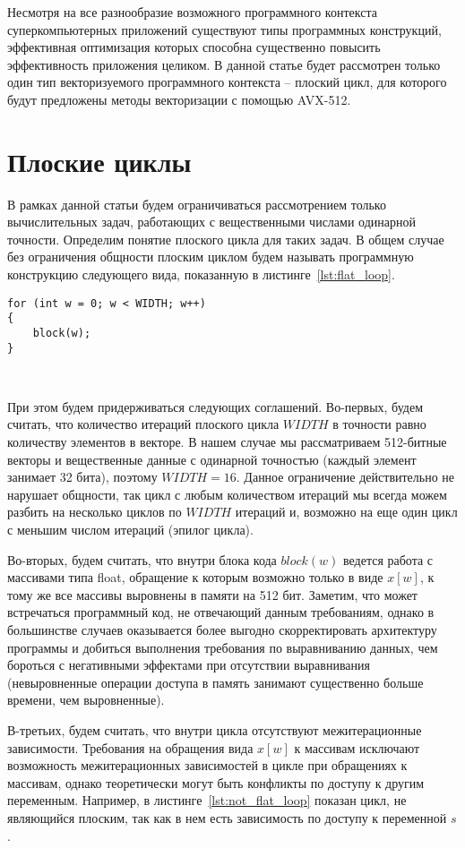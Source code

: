 \documentclass[
11pt,%
tightenlines,%
twoside,%
onecolumn,%
nofloats,%
nobibnotes,%
nofootinbib,%
superscriptaddress,%
noshowpacs,%
centertags]%
{revtex4}
\begin{document}
Несмотря на все разнообразие возможного программного контекста суперкомпьютерных приложений существуют типы программных конструкций, эффективная оптимизация которых способна существенно повысить эффективность приложения целиком.
В данной статье будет рассмотрен только один тип векторизуемого программного контекста -- плоский цикл, для которого будут предложены методы векторизации с помощью AVX-512.

\section{Плоские циклы}

В рамках данной статьи будем ограничиваться рассмотрением только вычислительных задач, работающих с вещественными числами одинарной точности.
Определим понятие плоского цикла для таких задач.
В общем случае без ограничения общности плоским циклом будем называть программную конструкцию следующего вида, показанную в листинге~\ref{lst:flat_loop}.

\begin{lstlisting}[caption={Общий вид плоского цикла.},label={lst:flat_loop}]
for (int w = 0; w < WIDTH; w++)
{
    block(w);
}
\end{lstlisting}

\

При этом будем придерживаться следующих соглашений.
Во-первых, будем считать, что количество итераций плоского цикла $WIDTH$ в точности равно количеству элементов в векторе.
В нашем случае мы рассматриваем 512-битные векторы и вещественные данные с одинарной точностью (каждый элемент занимает 32 бита), поэтому $WIDTH = 16$.
Данное ограничение действительно не нарушает общности, так цикл с любым количеством итераций мы всегда можем разбить на несколько циклов по $WIDTH$ итераций и, возможно на еще один цикл с меньшим числом итераций (эпилог цикла).

Во-вторых, будем считать, что внутри блока кода $block(w)$ ведется работа с массивами типа float, обращение к которым возможно только в виде $x[w]$, к тому же все массивы выровнены в памяти на 512 бит.
Заметим, что может встречаться программный код, не отвечающий данным требованиям, однако в большинстве случаев оказывается более выгодно скорректировать архитектуру программы и добиться выполнения требования по выравниванию данных, чем бороться с негативными эффектами при отсутствии выравнивания (невыровненные операции доступа в память занимают существенно больше времени, чем выровненные).

В-третьих, будем считать, что внутри цикла отсутствуют межитерационные зависимости.
Требования на обращения вида $x[w]$ к массивам исключают возможность межитерационных зависимостей в цикле при обращениях к массивам, однако теоретически могут быть конфликты по доступу к другим переменным.
Например, в листинге~\ref{lst:not_flat_loop} показан цикл, не являющийся плоским, так как в нем есть зависимость по доступу к переменной $s$.
\end{document}
